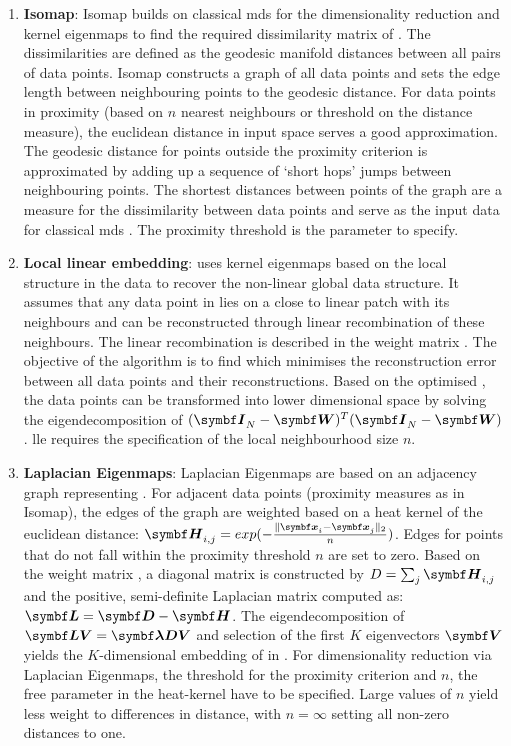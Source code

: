 \begin{enumerate}
\item\textbf{Isomap}: Isomap builds on classical \gls{mds} for the dimensionality reduction and kernel eigenmaps to find the required dissimilarity matrix of . The dissimilarities are defined as the geodesic manifold distances between all pairs of data points. Isomap constructs a graph of all data points and sets the edge length between neighbouring points to the geodesic distance. For data points in proximity (based on \(n\) nearest neighbours or threshold on the distance measure), the euclidean distance in input space serves a good approximation. The geodesic distance for points outside the proximity criterion is approximated by adding up a sequence of `short hops' jumps  between neighbouring points. The shortest distances between points of the graph are a measure for the dissimilarity between data points and serve as the input data for classical \gls{mds} \citep{Tenenbaum2000}. The proximity threshold is the parameter to specify. 

\item\textbf{Local linear embedding}:  uses kernel eigenmaps based on the local structure in the data to recover the non-linear global data structure. It assumes that any data point in  lies on a close to linear patch with its neighbours and can be reconstructed through linear recombination of these neighbours. The linear recombination is described in the weight matrix . The objective of the algorithm is to find  which minimises the reconstruction error between all data points and their reconstructions. Based on the optimised , the data points  can be transformed into lower dimensional space  by solving the eigendecomposition of \((\matsub{I}{N} -\mat{W})^T(\matsub{I}{N} -\mat{W})\) \citep{Roweis2000}. \gls{lle} requires the specification of the local neighbourhood size \(n\). 

\item\textbf{Laplacian Eigenmaps}: Laplacian Eigenmaps are based on an adjacency graph representing . For adjacent data points (proximity measures as in Isomap), the edges of the graph are weighted based on a heat kernel of the euclidean distance: \(\matsub{H}{i,j}=exp(-\frac{\lVert \matsub{x}{i} - \matsub{x}{j}\rVert_2}{n})\). Edges for points that do not fall within the proximity threshold \(n\) are set to zero.  Based on the weight matrix , a diagonal matrix  is constructed by \(D = \sum_{j} \matsub{H}{i,j}\) and the positive, semi-definite Laplacian matrix  computed as: \(\mat{L} = \mat{D} - \mat{H}\). The eigendecomposition of \(\mat{LV} = \mat{\lambda DV}\) and selection of the first \(K\) eigenvectors \(\mat{V}\) yields the \(K\)-dimensional embedding of  in  \citep{Belkin2003}. For dimensionality reduction via Laplacian Eigenmaps, the threshold for the proximity criterion and \(n\), the free parameter in the heat-kernel have to be specified. Large values of \(n\) yield less weight to differences in distance, with \(n=\infty\) setting all non-zero distances to one. 
 

\end{enumerate}
